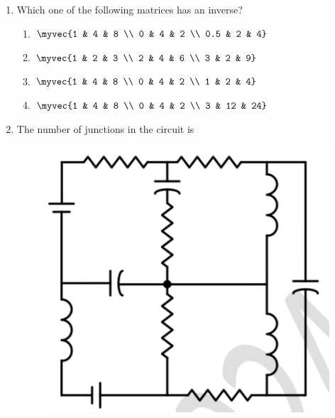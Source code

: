 \documentclass[journal,12pt,onecolumn]{IEEEtran}
\theoremstyle{remark}
\begin{document}
\begin{enumerate}[start=1, label=Q.\arabic*]
    \hfill{}


    \item Which one of the following matrices has an inverse?
    \begin{enumerate}
        \item $\myvec{1 & 4 & 8 \\ 0 & 4 & 2 \\ 0.5 & 2 & 4}$
        \item $\myvec{1 & 2 & 3 \\ 2 & 4 & 6 \\ 3 & 2 & 9}$
        \item $\myvec{1 & 4 & 8 \\ 0 & 4 & 2 \\ 1 & 2 & 4}$
        \item $\myvec{1 & 4 & 8 \\ 0 & 4 & 2 \\ 3 & 12 & 24}$
    \end{enumerate}

    \hfill{}

    \item The number of junctions in the circuit is
    \begin{figure}[H]
        \centering
        \includegraphics[width=0.5\columnwidth]{Figures/q12.png}
        \caption{}
    \end{figure}
    \begin{enumerate}
    \end{enumerate}


\end{enumerate}
\end{document}
